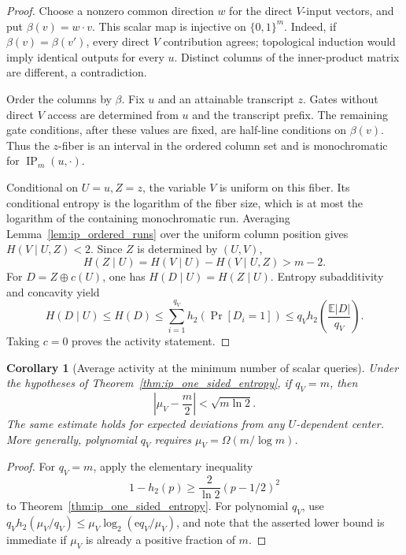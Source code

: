 \documentclass[11pt]{article}
\newtheorem{corollary}[theorem]{Corollary}
\theoremstyle{definition}
\newcommand{\bits}{\{0,1\}}
\newcommand{\ip}{\operatorname{IP}}
\newcommand{\Eul}{\mathrm e}
\begin{document}
\begin{proof}
Choose a nonzero common direction \(w\) for the direct \(V\)-input vectors, and put \(\beta(v)=w\cdot v\). This scalar map is injective on \(\bits^m\). Indeed, if \(\beta(v)=\beta(v')\), every direct \(V\) contribution agrees; topological induction would imply identical outputs for every \(u\). Distinct columns of the inner-product matrix are different, a contradiction.

Order the columns by \(\beta\). Fix \(u\) and an attainable transcript \(z\). Gates without direct \(V\) access are determined from \(u\) and the transcript prefix. The remaining gate conditions, after these values are fixed, are half-line conditions on \(\beta(v)\). Thus the \(z\)-fiber is an interval in the ordered column set and is monochromatic for \(\ip_m(u,\cdot)\).

Conditional on \(U=u,Z=z\), the variable \(V\) is uniform on this fiber. Its conditional entropy is the logarithm of the fiber size, which is at most the logarithm of the containing monochromatic run. Averaging Lemma~\ref{lem:ip_ordered_runs} over the uniform column position gives \(H(V\mid U,Z)<2\). Since \(Z\) is determined by \((U,V)\),
\[
 H(Z\mid U)=H(V\mid U)-H(V\mid U,Z)>m-2.
\]
For \(D=Z\mathbin\oplus c(U)\), one has \(H(D\mid U)=H(Z\mid U)\). Entropy subadditivity and concavity yield
\[
 H(D\mid U)\le H(D)
 \le\sum_{i=1}^{q_V}h_2(\Pr[D_i=1])
 \le q_V h_2\!\left(\frac{\mathbb E|D|}{q_V}\right).
\]
Taking \(c=0\) proves the activity statement.
\end{proof}

\begin{corollary}[Average activity at the minimum number of scalar queries]\label{cor:ip_one_sided_bias}
Under the hypotheses of Theorem~\ref{thm:ip_one_sided_entropy}, if \(q_V=m\), then
\[
 \left|\mu_V-\frac m2\right|<\sqrt{m\ln2}.
\]
The same estimate holds for expected deviations from any \(U\)-dependent center. More generally, polynomial \(q_V\) requires \(\mu_V=\Omega(m/\log m)\).
\end{corollary}

\begin{proof}
For \(q_V=m\), apply the elementary inequality
\[
 1-h_2(p)\ge\frac{2}{\ln2}(p-1/2)^2
\]
to Theorem~\ref{thm:ip_one_sided_entropy}. For polynomial \(q_V\), use
\(q_Vh_2(\mu_V/q_V)\le\mu_V\log_2(\Eul q_V/\mu_V)\), and note that the asserted lower bound is immediate if \(\mu_V\) is already a positive fraction of \(m\).
\end{proof}
\end{document}
